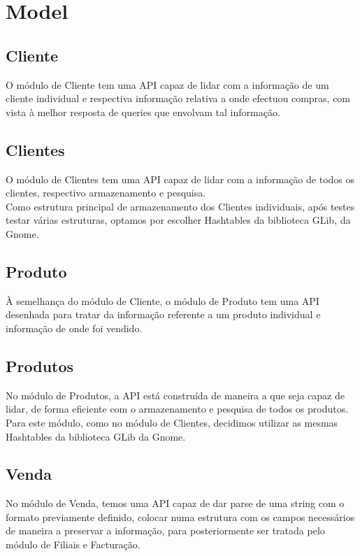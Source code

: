 \documentclass[a4paper]{report}
\begin{document}
\section{Model}

\subsection{Cliente}

O módulo de Cliente tem uma API capaz de lidar com a informação de um cliente
individual e respectiva informação relativa a onde efectuou compras, com vista
à melhor resposta de queries que envolvam tal informação.

\subsection{Clientes}

O módulo de Clientes tem uma API capaz de lidar com a informação de todos os
clientes, respectivo armazenamento e pesquisa. \\ 
Como estrutura principal de armazenamento dos Clientes individuais, após testes 
testar várias estruturas, optamos por escolher Hashtables da biblioteca GLib, 
da Gnome.

\subsection{Produto}

À semelhança do módulo de Cliente, o módulo de Produto tem uma API desenhada
para tratar da informação referente a um produto individual e informação de 
onde foi vendido.

\subsection{Produtos}

No módulo de Produtos, a API está construída de maneira a que seja capaz de
lidar, de forma eficiente com o armazenamento e pesquisa de todos os produtos.\\
Para este módulo, como no módulo de Clientes, decidimos utilizar as mesmas Hashtables
da biblioteca GLib da Gnome.

\subsection{Venda}

No módulo de Venda, temos uma API capaz de dar parse de uma string com o formato 
previamente definido, colocar numa estrutura com os campos necessários de maneira
a preservar a informação, para posteriormente ser tratada pelo módulo de Filiais e
Facturação.
\end{document}
